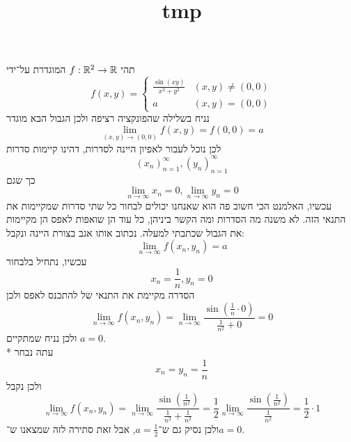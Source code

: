 
\usepackage{thmtools}
\title{tmp}
\setcounter{secnumdepth}{2}



תהי $f : \mathbb{R}^2 \to \mathbb{R}$ המוגדרת על־ידי
\[
	f(x, y) = \begin{cases}
		\frac{\sin(xy)}{x^2 + y^2} & (x, y) \ne (0, 0) \\
		a & (x, y) = (0, 0)
	\end{cases}
\]
נניח בשלילה שהפונקציה רציפה ולכן הגבול הבא מוגדר
\[
	\lim_{(x, y) \to (0, 0)} f(x, y) = f(0, 0) = a
\]
לכן נוכל לעבור לאפיון היינה לסדרות, דהינו קיימות סדרות
\[
	{(x_n)}_{n = 1}^\infty,
	{(y_n)}_{n = 1}^\infty
\]
כך שגם
\[
	\lim_{n \to \infty} x_n = 0,
	\lim_{n \to \infty} y_n = 0
\]
עכשיו, האלמנט הכי חשוב פה הוא שאנחנו יכולים לבחור כל שתי סדרות שמקיימות את התנאי הזה.
לא משנה מה הסדרות ומה הקשר ביניהן, כל עוד הן שואפות לאפס הן מקיימות את הגבול שכתבתי למעלה.
נכתוב אותו אגב בצורת היינה ונקבל:
\[
	\lim_{n \to \infty} f(x_n, y_n) = a
\]
עכשיו, נתחיל בלבחור
\[
	x_n = \frac{1}{n}, y_n = 0
\]
הסדרה מקיימת את התנאי של להתכנס לאפס ולכן
\[
	\lim_{n \to \infty} f(x_n, y_n)
	= \lim_{n \to \infty} \frac{\sin(\frac{1}{n} \cdot 0)}{\frac{1}{n^2} + 0} = 0
\]
ולכן נניח שמתקיים $a = 0$. \\*
עתה נבחר
\[
	x_n = y_n = \frac{1}{n}
\]
ולכן נקבל
\[
	\lim_{n \to \infty} f(x_n, y_n)
	= \lim_{n \to \infty} \frac{\sin(\frac{1}{n^2})}{\frac{1}{n^2} + \frac{1}{n^2}}
	= \frac{1}{2} \lim_{n \to \infty} \frac{\sin(\frac{1}{n^2})}{\frac{1}{n^2}}
	= \frac{1}{2} \cdot 1
\]
ולכן נסיק גם ש־$a = \frac{1}{2}$, אבל זאת סתירה לזה שמצאנו ש־$a = 0$.


